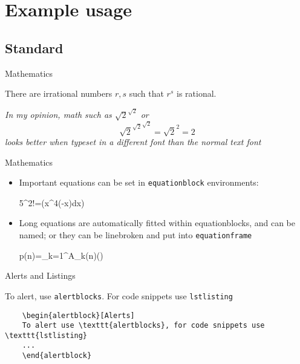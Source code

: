 \documentclass{beamer}
\begin{document}
\section{Example usage}
\subsection{Standard}

\begin{frame}{Mathematics}
\begin{theorem}
	There are irrational numbers $r,s$ such that $r^s$ is rational.
\end{theorem}
\textit{In my opinion, math such as $\sqrt{2}^{\sqrt{2}}$ or 
 $$
 {\sqrt{2}^{\sqrt{2}}}^{\sqrt{2}}=\sqrt{2}^{2}=2
 $$ looks better when typeset in a different font than the normal text font}\hfill\qedsymbol
\end{frame}
\begin{frame}{Mathematics}
\begin{itemize}
	\item Important equations can be set in \texttt{equationblock} environments:
	\begin{equationblock}
		5^2!=\exp\left(\int x^4\exp(-x)\;dx\right)
	\end{equationblock}	
	\item Long equations are automatically fitted within equationblocks, and can be named; or they can be linebroken and put into \texttt{equationframe}
	\begin{equationblock}
		p(n)=\sum_{k=1}^{\infty}A_{k}(n)\left(\sinh{}\right)
	\end{equationblock}
\end{itemize}
\end{frame}

\begin{frame}[fragile]{Alerts and Listings}
\begin{alertblock}
	To alert, use \texttt{alertblocks}. For code snippets use \texttt{lstlisting}
	\begin{lstlisting}
	\begin{alertblock}[Alerts]
	To alert use \texttt{alertblocks}, for code snippets use \texttt{lstlisting}
	...
	\end{alertblock}
	\end{lstlisting}
\end{alertblock}
\end{frame}
\end{document}
